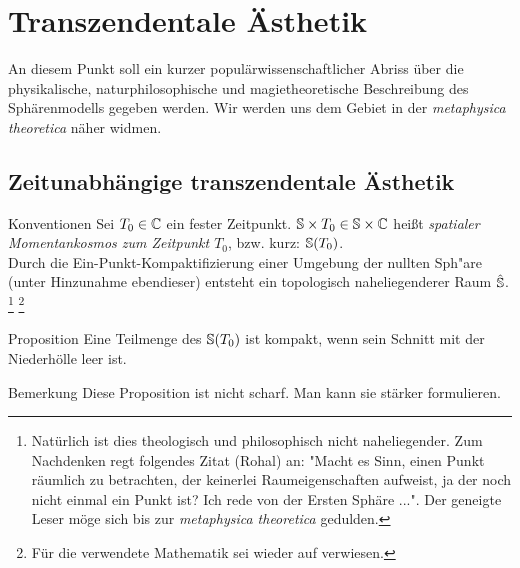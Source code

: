 \section{Transzendentale Ästhetik}
An diesem Punkt soll ein kurzer populärwissenschaftlicher Abriss über die physikalische, naturphilosophische und magietheoretische Beschreibung des Sphärenmodells gegeben werden. Wir werden uns dem Gebiet in der \emph{metaphysica theoretica} näher widmen.\\
\subsection{Zeitunabhängige transzendentale Ästhetik}
\begin{bla}{Konventionen}
Sei $T_0 \in \mathbb{C}$ ein fester Zeitpunkt. $\mathbb{S} \times {T_0} \in \mathbb{S} \times \mathbb{C}$ heißt \emph{spatialer Momentankosmos zum Zeitpunkt $T_0$}, bzw. kurz: $\mathbb{S} (T_0)$.\\
Durch die Ein-Punkt-Kompaktifizierung einer Umgebung der nullten Sph"are (unter Hinzunahme ebendieser) entsteht ein topologisch naheliegenderer Raum $\hat{\mathbb{S}}$.
\footnote{Natürlich ist dies theologisch und philosophisch nicht naheliegender. Zum Nachdenken regt folgendes Zitat (Rohal) an: "Macht es Sinn, einen Punkt räumlich zu betrachten, der keinerlei Raumeigenschaften aufweist, ja der noch nicht einmal ein Punkt ist? Ich rede von der Ersten Sphäre ...". Der geneigte Leser möge sich bis zur \emph{metaphysica theoretica} gedulden.}
\footnote{Für die verwendete Mathematik sei wieder auf \cite{erzzwerge} verwiesen.}
\end{bla}
\begin{bla}{Proposition}
Eine Teilmenge des $\mathbb{S} (T_0)$ ist kompakt, wenn sein Schnitt mit der Niederhölle leer ist. 
\end{bla}
\begin{bla}{Bemerkung}
Diese Proposition ist nicht scharf. Man kann sie stärker formulieren.
\end{bla}